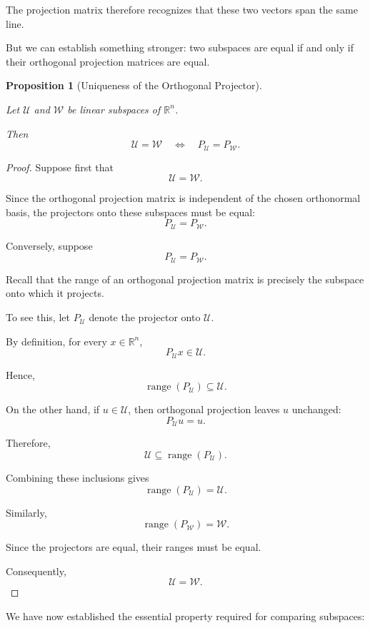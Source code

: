 \documentclass[14pt,letterpaper]{article}
\theoremstyle{plain}
\newtheorem{proposition}[theorem]{Proposition}
\theoremstyle{definition}
\theoremstyle{remark}
\newcommand{\R}{\mathbb{R}}
\DeclareMathOperator{\range}{range}
\begin{document}
The projection matrix therefore
recognizes that these two vectors
span the same line.

But we can establish something
stronger: two subspaces are equal
if and only if their orthogonal
projection matrices are equal.

\begin{proposition}[Uniqueness of the
Orthogonal Projector]
\label{prop:unique_projector}

Let $\mathcal U$ and $\mathcal W$
be linear subspaces of $\R^n$.

Then
\[
\boxed{
\mathcal U=\mathcal W
\quad\Longleftrightarrow\quad
P_{\mathcal U}=P_{\mathcal W}.
}
\]

\end{proposition}

\begin{proof}

Suppose first that
\[
\mathcal U=\mathcal W.
\]

Since the orthogonal projection
matrix is independent of the
chosen orthonormal basis,
the projectors onto these
subspaces must be equal:
\[
P_{\mathcal U}=P_{\mathcal W}.
\]

Conversely, suppose
\[
P_{\mathcal U}=P_{\mathcal W}.
\]

Recall that the range of an
orthogonal projection matrix
is precisely the subspace
onto which it projects.

To see this, let $P_{\mathcal U}$
denote the projector onto
$\mathcal U$.

By definition, for every
$x\in\R^n$,
\[
P_{\mathcal U}x\in\mathcal U.
\]

Hence,
\[
\range(P_{\mathcal U})
\subseteq\mathcal U.
\]

On the other hand, if
$u\in\mathcal U$, then
orthogonal projection leaves
$u$ unchanged:
\[
P_{\mathcal U}u=u.
\]

Therefore,
\[
\mathcal U
\subseteq\range(P_{\mathcal U}).
\]

Combining these inclusions gives
\[
\boxed{
\range(P_{\mathcal U})=\mathcal U.
}
\]

Similarly,
\[
\range(P_{\mathcal W})=\mathcal W.
\]

Since the projectors are equal,
their ranges must be equal.

Consequently,
\[
\boxed{
\mathcal U=\mathcal W.
}
\]

\end{proof}

We have now established the
essential property required
for comparing subspaces:
\end{document}
